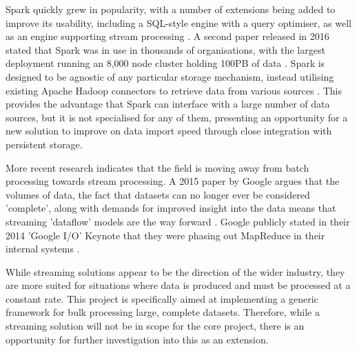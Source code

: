 Spark quickly grew in popularity, with a number of extensions being added to improve its usability, including a SQL-style engine with a query optimiser, as well as an engine supporting stream processing \cite{armbrust2015sparksql, armbrust2018sparkstreaming}. A second paper released in 2016 stated that Spark was in use in thousands of organisations, with the largest deployment running an 8,000 node cluster holding 100PB of data \cite{zaharia2016spark}. Spark is designed to be agnostic of any particular storage mechanism, instead utilising existing Apache Hadoop connectors to retrieve data from various sources \cite{rddprogrammingguide}. This provides the advantage that Spark can interface with a large number of data sources, but it is not specialised for any of them, presenting an opportunity for a new solution to improve on data import speed through close integration with persistent storage.

More recent research indicates that the field is moving away from batch processing towards stream processing. A 2015 paper by Google argues that the volumes of data, the fact that datasets can no longer ever be considered 'complete', along with demands for improved insight into the data means that streaming 'dataflow' models are the way forward  \cite{akidau2015dataflow}. Google publicly stated in their 2014 'Google I/O' Keynote that they were phasing out MapReduce in their internal systems \cite{googleio2014}. 

While streaming solutions appear to be the direction of the wider industry, they are more suited for situations where data is produced and must be processed at a constant rate. This project is specifically aimed at implementing a generic framework for bulk processing large, complete datasets. Therefore, while a streaming solution will not be in scope for the core project, there is an opportunity for further investigation into this as an extension.

